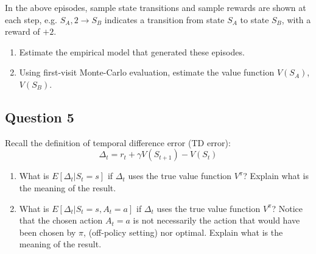 \documentclass[11pt]{article}
\begin{document}
In the above episodes, sample state transitions and sample rewards are shown at each step, e.g. $S_A,2 \rightarrow S_B$ indicates a transition from state $S_A$ to state $S_B$, with a reward of $+2$.

\begin{enumerate}[label=(\alph*)]
\item Estimate the empirical model that generated these episodes.
\item Using first-visit Monte-Carlo evaluation, estimate the value function $V(S_A)$, $V(S_B)$.
\end{enumerate}


\subsection{Question 5}
Recall the definition of temporal difference error (TD error):
\[
\Delta_t =r_t+\gamma V(S_{t+1})-V(S_t)
\]
\begin{enumerate}[label=(\alph*)]
\item  What is $E[\Delta_t|S_t = s]$ if $\Delta_t$ uses the true value function $V^\pi$? Explain what is the meaning of the result.
\item What is $E[\Delta_t|S_t = s,A_t=a]$ if $\Delta_t$ uses the true value function $V^\pi$? Notice that the chosen action $A_t=a$ is not necessarily the action that would have been chosen by $\pi$,  (off-policy setting) nor optimal. Explain what is the meaning of the result.
\end{enumerate}

\end{document}
